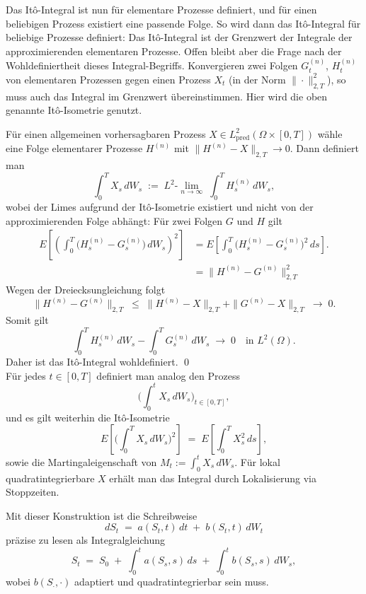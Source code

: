\begin{defi}[It\^o-Integral]
Das It\^o-Integral ist nun für elementare Prozesse definiert, und für einen beliebigen Prozess existiert
eine passende Folge. So wird dann das It\^o-Integral für beliebige Prozesse definiert:
Das It\^o-Integral ist der Grenzwert der Integrale der approximierenden elementaren Prozesse.
Offen bleibt aber die Frage nach der Wohldefiniertheit dieses Integral-Begriffs. Konvergieren zwei Folgen $G_t^{(n)}$, $H_t^{(n)}$ von
elementaren Prozessen gegen einen Prozess $X_t$ (in der Norm $\|\cdot\|_{2,T}^2$), so muss auch das Integral im Grenzwert übereinstimmen.
Hier wird die oben genannte It\^o-Isometrie genutzt.

Für einen allgemeinen vorhersagbaren Prozess $X\in L^2_{\mathrm{pred}}(\Omega\times[0,T])$ wähle 
eine Folge elementarer Prozesse $H^{(n)}$ mit
$\|H^{(n)}-X\|_{2,T}\to 0$. Dann definiert man
$$
\int_0^T X_s\,dW_s \;:=\; L^2\text{-}\lim_{n\to\infty}\;\int_0^T H^{(n)}_s\,dW_s,
$$
wobei der Limes aufgrund der It\^o-Isometrie existiert und nicht von der approximierenden Folge abhängt:
Für zwei Folgen $G$ und $H$ gilt
$$
\begin{aligned}
E\!\left[
   \left( \int_0^T \big(H^{(n)}_s - G^{(n)}_s\big)\,dW_s \right)^2
\right]
&= 
E \left [ \int_0^T \big(H^{(n)}_s - G^{(n)}_s\big)^2\,ds \right ].
\\ &= \|H^{(n)} - G^{(n)}\|_{2,T}^2
\end{aligned}
$$
Wegen der Dreiecksungleichung folgt
$$
\|H^{(n)} - G^{(n)}\|_{2,T} 
\;\le\; 
\|H^{(n)} - X\|_{2,T} + \|G^{(n)} - X\|_{2,T}
\;\to\; 0.
$$
Somit gilt
$$
\int_0^T H^{(n)}_s\,dW_s - \int_0^T G^{(n)}_s\,dW_s 
\;\to\; 0 \quad \text{in } L^2(\Omega).
$$
Daher ist das It\^o-Integral wohldefiniert. \qed \\
Für jedes $t\in[0,T]$ definiert man analog den Prozess
$$
\Big(\int_0^t X_s\,dW_s\Big)_{t\in[0,T]},
$$
und es gilt weiterhin die It\^o-Isometrie
$$
E\!\left[\Big(\int_0^T X_s\,dW_s\Big)^{\!2}\right] \;=\; E\!\left[\int_0^T X_s^{2}\,ds\right],
$$
sowie die Martingaleigenschaft von $M_t:=\int_0^t X_s\,dW_s$. Für lokal 
quadratintegrierbare $X$ erhält man das Integral durch Lokalisierung via Stoppzeiten.
\end{defi}

\begin{defi}
Mit dieser Konstruktion ist die Schreibweise
$$
dS_t \;=\; a(S_t,t)\,dt \;+\; b(S_t,t)\,dW_t
$$
präzise zu lesen als Integralgleichung
$$
S_t \;=\; S_0 \;+\; \int_0^t a(S_s,s)\,ds \;+\; \int_0^t b(S_s,s)\,dW_s,
$$
wobei $b(S_\cdot,\cdot)$ adaptiert und quadratintegrierbar sein muss.
\end{defi}

